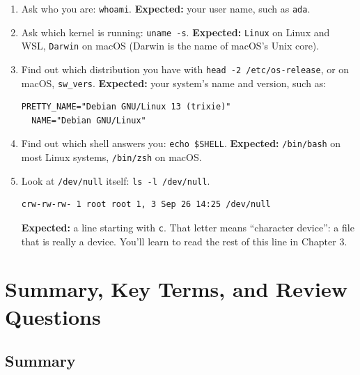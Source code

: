 \begin{enumerate}
\def\labelenumi{\arabic{enumi}.}
\item
  Ask who you are: \texttt{whoami}. \textbf{Expected:} your user name, such as \texttt{ada}.
\item
  Ask which kernel is running: \texttt{uname\ -s}. \textbf{Expected:} \texttt{Linux} on Linux and WSL, \texttt{Darwin} on macOS (Darwin is the name of macOS's Unix core).
\item
  Find out which distribution you have with \texttt{head\ -2\ /}\allowbreak{}\texttt{etc/}\allowbreak{}\texttt{os-release}, or on macOS, \texttt{sw\_vers}. \textbf{Expected:} your system's name and version, such as:

  \begin{codeblock}
  \begin{Verbatim}[formatcom=\outputstyle]
  PRETTY_NAME="Debian GNU/Linux 13 (trixie)"
  NAME="Debian GNU/Linux"
  \end{Verbatim}
  \end{codeblock}
\item
  Find out which shell answers you: \texttt{echo\ \$SHELL}. \textbf{Expected:} \texttt{/bin/bash} on most Linux systems, \texttt{/bin/zsh} on macOS.
\item
  Look at \texttt{/dev/null} itself: \texttt{ls\ -l\ /dev/null}.

  \begin{codeblock}
  \begin{Verbatim}[formatcom=\outputstyle]
  crw-rw-rw- 1 root root 1, 3 Sep 26 14:25 /dev/null
  \end{Verbatim}
  \end{codeblock}

  \textbf{Expected:} a line starting with \texttt{c}. That letter means ``character device'': a file that is really a device. You'll learn to read the rest of this line in Chapter 3.
\end{enumerate}

\section{Summary, Key Terms, and Review Questions}\label{01-the-machine-behind-the-terminal:summary-key-terms-and-review-questions}

\subsection*{Summary}\label{01-the-machine-behind-the-terminal:summary}

